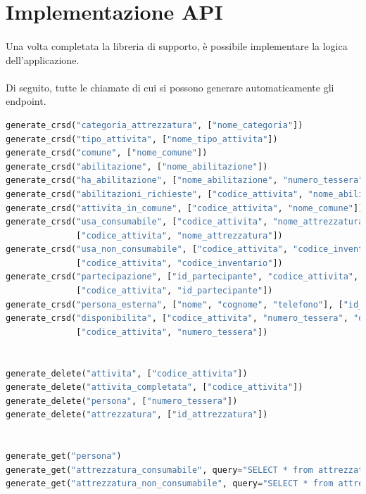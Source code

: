 \documentclass[12pt,a4paper,twoside,english,italian]{book}
\begin{document}
\section{Implementazione API}

\paragraph{} Una volta completata la libreria di supporto, è possibile implementare la logica dell'applicazione. 

\paragraph{} Di seguito, tutte le chiamate di cui si possono generare automaticamente gli endpoint.

\begin{lstlisting}[language=python, caption=Endpoint generati automaticamente]
generate_crsd("categoria_attrezzatura", ["nome_categoria"])
generate_crsd("tipo_attivita", ["nome_tipo_attivita"])
generate_crsd("comune", ["nome_comune"])
generate_crsd("abilitazione", ["nome_abilitazione"])
generate_crsd("ha_abilitazione", ["nome_abilitazione", "numero_tessera"])
generate_crsd("abilitazioni_richieste", ["codice_attivita", "nome_abilitazione"])
generate_crsd("attivita_in_comune", ["codice_attivita", "nome_comune"])
generate_crsd("usa_consumabile", ["codice_attivita", "nome_attrezzatura", "quantita_utilizzata"],
              ["codice_attivita", "nome_attrezzatura"])
generate_crsd("usa_non_consumabile", ["codice_attivita", "codice_inventario", "rientrato", "stato_attuale_attrezzatura"],
              ["codice_attivita", "codice_inventario"])
generate_crsd("partecipazione", ["id_partecipante", "codice_attivita", "squadra", "timestamp_ingresso", "timestamp_uscita"],
              ["codice_attivita", "id_partecipante"])
generate_crsd("persona_esterna", ["nome", "cognome", "telefono"], ["id_partecipante"], returning="idPartecipante")
generate_crsd("disponibilita", ["codice_attivita", "numero_tessera", "disponibilita_positiva"],
              ["codice_attivita", "numero_tessera"])


generate_delete("attivita", ["codice_attivita"])
generate_delete("attivita_completata", ["codice_attivita"])
generate_delete("persona", ["numero_tessera"])
generate_delete("attrezzatura", ["id_attrezzatura"])


generate_get("persona")
generate_get("attrezzatura_consumabile", query="SELECT * from attrezzatura natural join attrezzatura_consumabile")
generate_get("attrezzatura_non_consumabile", query="SELECT * from attrezzatura natural join attrezzatura_non_consumabile")
\end{lstlisting}
\end{document}
